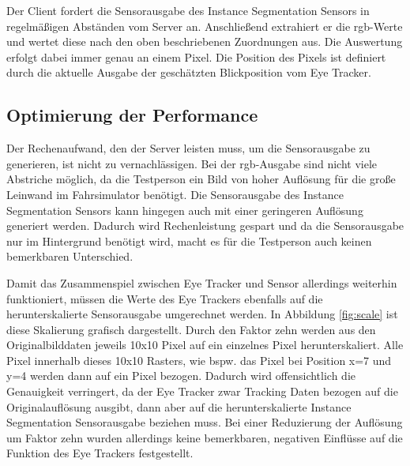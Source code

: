 Der Client fordert die Sensorausgabe des Instance Segmentation Sensors in regelmäßigen Abständen vom Server an. Anschließend extrahiert er die \acrshort{rgb}-Werte und wertet diese nach den oben beschriebenen Zuordnungen aus. Die Auswertung erfolgt dabei immer genau an einem Pixel. Die Position des Pixels ist definiert durch die aktuelle Ausgabe der geschätzten Blickposition vom Eye Tracker. 

\subsection{Optimierung der Performance}
Der Rechenaufwand, den der Server leisten muss, um die Sensorausgabe zu generieren, ist nicht zu vernachlässigen. Bei der \acrshort{rgb}-Ausgabe sind nicht viele Abstriche möglich, da die Testperson ein Bild von hoher Auflösung für die große Leinwand im Fahrsimulator benötigt. Die Sensorausgabe des Instance Segmentation Sensors kann hingegen auch mit einer geringeren Auflösung generiert werden. Dadurch wird Rechenleistung gespart und da die Sensorausgabe nur im Hintergrund benötigt wird, macht es für die Testperson auch keinen bemerkbaren Unterschied. 

Damit das Zusammenspiel zwischen Eye Tracker und Sensor allerdings weiterhin funktioniert, müssen die Werte des Eye Trackers ebenfalls auf die herunterskalierte Sensorausgabe umgerechnet werden. In Abbildung \ref{fig:scale} ist diese Skalierung grafisch dargestellt. Durch den Faktor zehn werden aus den Originalbilddaten jeweils 10x10 Pixel auf ein einzelnes Pixel herunterskaliert. Alle Pixel innerhalb dieses 10x10 Rasters, wie bspw. das Pixel bei Position x=7 und y=4 werden dann auf ein Pixel bezogen. Dadurch wird offensichtlich die Genauigkeit verringert, da der Eye Tracker zwar Tracking Daten bezogen auf die Originalauflösung ausgibt, dann aber auf die herunterskalierte Instance Segmentation Sensorausgabe beziehen muss. Bei einer Reduzierung der Auflösung um Faktor zehn wurden allerdings keine bemerkbaren, negativen Einflüsse auf die Funktion des Eye Trackers festgestellt.



